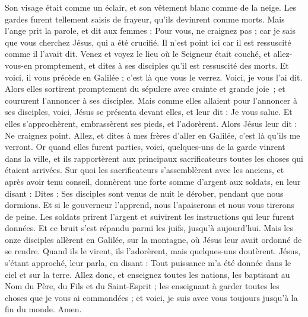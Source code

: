 \begin{multicols}{2}
Son visage était comme un éclair, et son vêtement blanc comme de la neige.
Les gardes furent tellement saisis de frayeur, qu'ils devinrent comme morts.
Mais l'ange prit la parole, et dit aux femmes : Pour vous, ne craignez pas ; car je sais que vous cherchez Jésus, qui a été crucifié.
Il n'est point ici car il est ressuscité comme il l'avait dit. Venez et voyez le lieu où le Seigneur était couché,
et allez-vous-en promptement, et dites à ses disciples qu'il est ressuscité des morts. Et voici, il vous précède en Galilée ; c’est là que vous le verrez. Voici, je vous l’ai dit.
Alors elles sortirent promptement du sépulcre avec crainte et grande joie ; et coururent l’annoncer à ses disciples.
Mais comme elles allaient pour l'annoncer à ses disciples, voici, Jésus se présenta devant elles, et leur dit : Je vous salue. Et elles s'approchèrent, embrassèrent ses pieds, et l'adorèrent.
Alors Jésus leur dit : Ne craignez point. Allez, et dites à mes frères d'aller en Galilée, c’est là qu'ils me verront.
 Or quand elles furent parties, voici, quelques-uns de la garde vinrent dans la ville, et ils rapportèrent aux principaux sacrificateurs toutes les choses qui étaient arrivées.
Sur quoi les sacrificateurs s'assemblèrent avec les anciens, et après avoir tenu conseil, donnèrent une forte somme d'argent aux soldats,
en leur disant : Dites : Ses disciples sont venus de nuit le dérober, pendant que nous dormions.
Et si le gouverneur l’apprend, nous l’apaiserons et nous vous tirerons de peine.
Les soldats prirent l'argent et suivirent les instructions qui leur furent données. Et ce bruit s’est répandu parmi les juifs, jusqu’à aujourd’hui.
Mais les onze disciples allèrent en Galilée, sur la montagne, où Jésus leur avait ordonné de se rendre.
Quand ils le virent, ils l'adorèrent, mais quelques-uns doutèrent.
Jésus, s’étant approché, leur parla, en disant : Tout puissance m’a été donnée dans le ciel et sur la terre.
Allez donc, et enseignez toutes les nations, les baptisant au Nom du Père, du Fils et du Saint-Esprit ;
les enseignant à garder toutes les choses que je vous ai commandées ; et voici, je suis avec vous toujours jusqu’à la fin du monde. Amen.
\PPE{}
\end{multicols}
